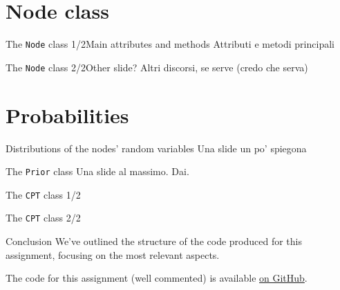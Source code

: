 \documentclass[10pt,xcolor={table,dvipsnames}]{beamer} 		%
\theoremstyle{plain}					%
\theoremstyle{definition}
\theoremstyle{remark}
\begin{document}
\section*{Node class}
	\begin{frame}{The \texttt{Node} class 1/2}{Main attributes and methods}
		Attributi e metodi principali
	\end{frame}

	\begin{frame}{The \texttt{Node} class 2/2}{Other slide?}
		Altri discorsi, se serve (credo che serva)
	\end{frame}


\section*{Probabilities}
	\begin{frame}{Distributions of the nodes' random variables}
		Una slide un po' spiegona
	\end{frame}

	\begin{frame}{The \texttt{Prior} class}
		Una slide al massimo. Dai.
	\end{frame}

	\begin{frame}{The \texttt{CPT} class 1/2}
		
	\end{frame}

	\begin{frame}{The \texttt{CPT} class 2/2}
		
	\end{frame}

    
    \begin{frame}{Conclusion}
        We've outlined the structure of the code produced for this assignment, 
		focusing on the most relevant aspects. 
		\bigskip 


		The code for this assignment (well commented) is available
		\href{https://github.com/M4rinz/ISPR-Assignments}{on GitHub}.
    \end{frame}
\end{document}
